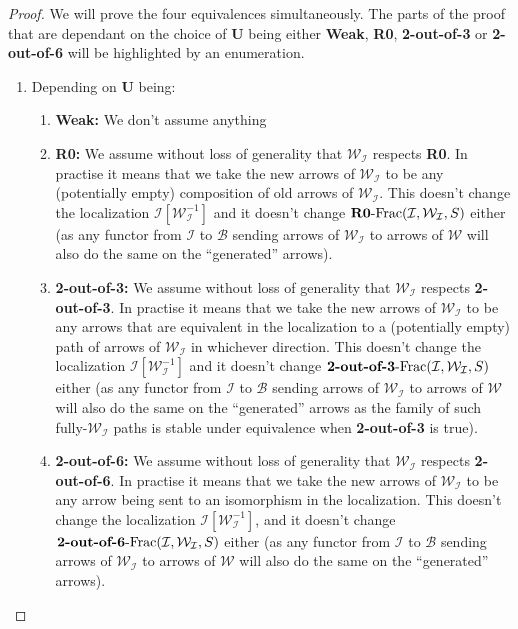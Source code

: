 \documentclass{article}
\numberwithin{equation}{section}
\theoremstyle{definition}
\theoremstyle{plain}
\begin{document}
\begin{proof} 
	
	We will prove the four equivalences simultaneously. The parts of the proof that are dependant on the choice of \textbf{U} being either \textbf{Weak}, \textbf{R0}, \textbf{2-out-of-3} or \textbf{2-out-of-6} will be highlighted by an enumeration.
	
	\begin{enumerate}
		\item[$(\Rightarrow)$] Depending on \textbf{U} being:
		\begin{enumerate}[label = $\bullet$]
			\item \textbf{Weak:} We don't assume anything
			\item \textbf{R0:} We assume without loss of generality that $\mathcal{W}_{\mathcal{I}}$ respects \textbf{R0}. In practise it means that we take the new arrows of $\mathcal{W}_{\mathcal{I}}$ to be any (potentially empty) composition of old arrows of $\mathcal{W}_{\mathcal{I}}$. This doesn't change the localization $\mathcal{I}[\mathcal{W}_{\mathcal{I}}^{-1}]$ and it doesn't change $\textnormal{\textbf{R0}-Frac}(\mathcal{I}, \mathcal{W}_{\mathcal{I}}, S)$ either (as any functor from $\mathcal{I}$ to $\mathcal{B}$ sending arrows of $\mathcal{W}_{\mathcal{I}}$ to arrows of $\mathcal{W}$ will also do the same on the ``generated'' arrows).
			\item \textbf{2-out-of-3:} We assume without loss of generality that $\mathcal{W}_{\mathcal{I}}$ respects \textbf{2-out-of-3}. In practise it means that we take the new arrows of $\mathcal{W}_{\mathcal{I}}$ to be any arrows that are equivalent in the localization to a (potentially empty) path of arrows of $\mathcal{W}_{\mathcal{I}}$ in whichever direction. This doesn't change the localization $\mathcal{I}[\mathcal{W}_{\mathcal{I}}^{-1}]$ and it doesn't change $\textnormal{\textbf{2-out-of-3}-Frac}(\mathcal{I}, \mathcal{W}_{\mathcal{I}}, S)$ either (as any functor from $\mathcal{I}$ to $\mathcal{B}$ sending arrows of $\mathcal{W}_{\mathcal{I}}$ to arrows of $\mathcal{W}$ will also do the same on the ``generated'' arrows as the family of such fully-$\mathcal{W}_{\mathcal{I}}$ paths is stable under equivalence when \textbf{2-out-of-3} is true).
			\item \textbf{2-out-of-6:} We assume without loss of generality that $\mathcal{W}_{\mathcal{I}}$ respects \textbf{2-out-of-6}. In practise it means that we take the new arrows of $\mathcal{W}_{\mathcal{I}}$ to be any arrow being sent to an isomorphism in the localization. This doesn't change the localization $\mathcal{I}[\mathcal{W}_{\mathcal{I}}^{-1}]$, and it doesn't change $\textnormal{\textbf{2-out-of-6}-Frac}(\mathcal{I}, \mathcal{W}_{\mathcal{I}}, S)$ either (as any functor from $\mathcal{I}$ to $\mathcal{B}$ sending arrows of $\mathcal{W}_{\mathcal{I}}$ to arrows of $\mathcal{W}$ will also do the same on the ``generated'' arrows).
		\end{enumerate}
		

\end{enumerate}
\end{proof}
\end{document}
